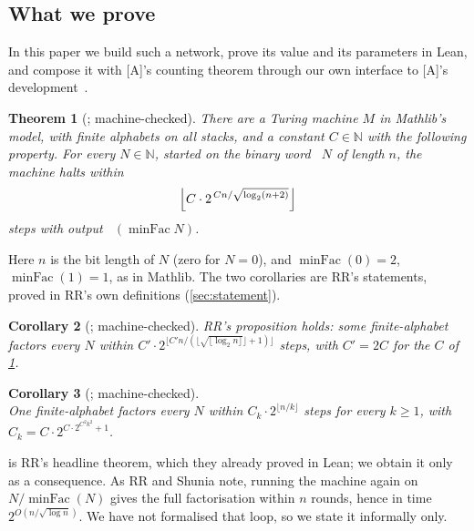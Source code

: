\documentclass[10pt]{amsart}
\theoremstyle{plain}
\newtheorem{theorem}{Theorem}[section]
\newtheorem{corollary}[theorem]{Corollary}
\theoremstyle{definition}
\theoremstyle{remark}
\numberwithin{equation}{section}
\newcommand{\minFac}{\operatorname{minFac}}
\newcommand{\A}{\textup{[A]}}
\newcommand{\N}{\mathbb{N}}
\begin{document}
\subsection{What we prove}
In this paper we build such a network, prove its value and its parameters in Lean, and compose it with
\A's counting theorem through our own interface to \A's development~\cite{Tulsyan26}.

\begin{theorem}[; machine-checked]\label{thm:main}
There are a Turing machine $M$ in Mathlib's  model, with finite alphabets on all stacks,
and a constant $C\in\N$ with the following property. For every $N\in\N$, started on the binary word
~$N$ of length $n$, the machine halts within
\[
  \Bigl\lfloor C\cdot 2^{\,C n/\sqrt{\log_2(n+2)}}\Bigr\rfloor
\]
steps with output ~$(\minFac N)$.
\end{theorem}

\noindent Here $n$ is the bit length of $N$ (zero for $N=0$), and $\minFac(0)=2$, $\minFac(1)=1$, as in
Mathlib. The two corollaries are RR's statements, proved in RR's own definitions (\cref{sec:statement}).

\begin{corollary}[; machine-checked]\label{cor:conj}
RR's proposition  holds: some finite-alphabet
 factors every $N$ within
$C'\cdot2^{\lfloor C'n/(\lfloor\sqrt{\lfloor\log_2 n\rfloor}\rfloor+1)\rfloor}$ steps, with $C'=2C$ for
the $C$ of \cref{thm:main}.
\end{corollary}

\begin{corollary}[; machine-checked]\label{cor:rr}\leavevmode\\
One finite-alphabet  factors every $N$ within $C_k\cdot2^{\lfloor n/k\rfloor}$
steps for every $k\ge1$, with $C_k=C\cdot2^{C\cdot 2^{C^2k^2}+1}$.
\end{corollary}

\noindent {} is RR's headline theorem, which they already proved in Lean; we obtain it only as
a consequence. As RR and Shunia note, running the machine again on $N/\minFac(N)$ gives the full
factorisation within $n$ rounds, hence in time $2^{O(n/\sqrt{\log n})}$. We have not formalised that
loop, so we state it informally only.
\end{document}
